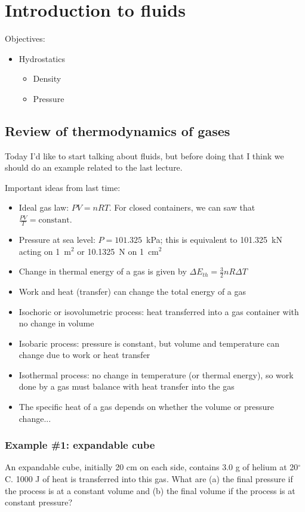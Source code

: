 \section{Introduction to fluids}
Objectives:
\begin{itemize}
\item Hydrostatics
  \begin{itemize}
  \item Density
  \item Pressure
  \end{itemize}
\end{itemize}

\subsection{Review of thermodynamics of gases}
Today I'd like to start talking about fluids, but before doing that I think we should do an example related to the last lecture.

Important ideas from last time:
\begin{itemize}
\item Ideal gas law: $PV=nRT$. For closed containers, we can saw that $\frac{PV}{T}=\mbox{constant}$.
\item Pressure at sea level: $P=101.325$~kPa; this is equivalent to 101.325~kN acting on 1~m$^2$ or 10.1325~N on 1~cm$^2$
\item Change in thermal energy of a gas is given by $\Delta{E_{th}}=\frac{3}{2}nR\Delta{T}$
\item Work and heat (transfer) can change the total energy of a gas
\item Isochoric or isovolumetric process: heat transferred into a gas container with no change in volume
\item Isobaric process: pressure is constant, but volume and temperature can change due to work or heat transfer
\item Isothermal process: no change in temperature (or thermal energy), so work done by a gas must balance with heat transfer into the gas
\item The specific heat of a gas depends on whether the volume or pressure change...
\end{itemize}

\subsubsection{Example \#1: expandable cube}
An expandable cube, initially 20 cm on each side, contains 3.0 g of helium at 20$^\circ$C. 1000 J of heat is transferred into this gas. What are (a) the final pressure if the process is at a constant volume and (b) the final volume if the process is at constant pressure?


